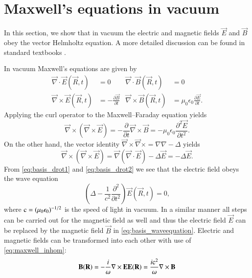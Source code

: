\section{Maxwell's equations in vacuum}

In this section, we show that in vacuum the electric and magnetic fields $\vec
E$ and $\vec B$ obey the vector Helmholtz equation. A more detailed discussion
can be found in standard textbooks \cite{bohrenhuffman,jackson, mueller,
stratton}.

In vacuum Maxwell's equations are given by
\begin{align}
\label{eq:maxwell_hom}
\vec{\nabla}\cdot \vec{E}(\vec R, t) &= 0 & \vec{\nabla}\cdot\vec{B}(\vec R, t) &= 0 \\
\label{eq:maxwell_inhom}
\vec{\nabla}\times\vec{E}(\vec R, t) &= -\displaystyle\frac{\partial\vec B}{\partial t} & \vec{\nabla} \times \vec{B}(\vec R, t) &= \mu_0\epsilon_0 \displaystyle\frac{\partial\vec E}{\partial t}.
\end{align}
Applying the curl operator to the Maxwell--Faraday equation yields
\begin{equation}
\label{eq:basis_drot1}
\vec\nabla \times \left(\vec\nabla \times \vec E\right) =
-\frac{\partial}{\partial t} \vec\nabla \times \vec B =
-\mu_0\epsilon_0 \frac{\partial^2\vec E}{\partial t^2}.
\end{equation}
On the other hand, the vector identity $\vec\nabla\times\vec\nabla\times = \nabla\nabla - \Delta$ yields
\begin{equation}
\label{eq:basis_drot2}
\vec\nabla \times \left(\vec\nabla \times \vec E\right) =
\vec\nabla\left(\vec\nabla\cdot \vec E\right) - \Delta\vec E =
-\Delta\vec E.
\end{equation}
From \eqref{eq:basis_drot1} and \eqref{eq:basis_drot2} we see that the
electric field obeys the wave equation
\begin{equation}
\label{eq:basis_waveequation}
\left(\Delta - \frac{1}{c^2}\frac{\partial^2}{\partial t^2}\right) \vec E(\vec R,t) = 0,
\end{equation}
where $\mathrm{c}=(\mu_0\epsilon_0)^{-1/2}$ is the speed of light in vacuum.
In a similar manner all steps can be carried out for the magnetic field as well
and thus the electric field $\vec E$ can be replaced by the magnetic field
$\vec B$ in \eqref{eq:basis_waveequation}. Electric and magnetic fields can be
transformed into each other with use of \eqref{eq:maxwell_inhom}:
\begin{equation}
\label{eq:basis_EB2BE}
{\mathbf{B}}({\mathbf{R}}) = -\frac{i}{\omega} {\mathbf{\nabla}} \times {\mathbf{E}} \\
{\mathbf{E}}({\mathbf{R}}) = \frac{i \mathrm{c}^2}{\omega} {\mathbf{\nabla}} \times {\mathbf{B}}
\end{equation}
